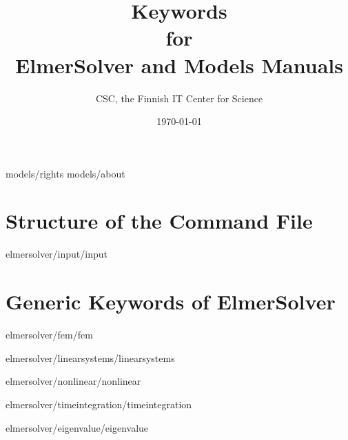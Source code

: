 \documentclass[a4paper,english,10pt]{report}    %
\title{\Huge{\bf Keywords \\ for \\ ElmerSolver and Models Manuals}}
\author{CSC, the Finnish IT Center for Science}
\date{\today}
\newcommand{\Include}{} %
\begin{document}
\maketitle


\begin{versiona}
\Include{models/rights}
\Include{models/about}


\pagestyle{empty}



\setcounter{secnumdepth}{2}
\setcounter{tocdepth}{1}  

\tableofcontents
\end{versiona}



\newpage
\pagestyle{fancy}


\clearpage
{}



\chapter{Structure of the Command File}

\graphicspath{{./}{input/}}
\Include{elmersolver/input/input}

\chapter{Generic Keywords of ElmerSolver}
\begin{versiona}
\graphicspath{{./}{fem/}}
\Include{elmersolver/fem/fem}
\end{versiona}

\graphicspath{{./}{linearsystems/}}
\Include{elmersolver/linearsystems/linearsystems}

\graphicspath{{./}{nonlinear/}}
\Include{elmersolver/nonlinear/nonlinear}

\graphicspath{{./}{timeintegration/}}
\Include{elmersolver/timeintegration/timeintegration}

\graphicspath{{./}{eigenvalue/}}
\Include{elmersolver/eigenvalue/eigenvalue}
\end{document}
